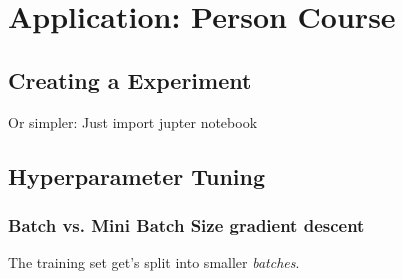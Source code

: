 \chapter{Application: Person Course}
\section{Creating a Experiment}

Or simpler: Just import jupter notebook

\section{Hyperparameter Tuning} 




\subsection{Batch vs. Mini Batch Size gradient descent}

The training set get's split into smaller \textit{batches}.



